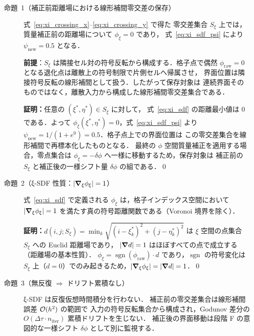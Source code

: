 \begin{description}
\item[命題~1（補正前距離場における線形補間零交差の保存）]
式~\eqref{eq:xi_crossing_x}--\eqref{eq:xi_crossing_y} で得た
零交差集合 $S_\xi$ 上では，質量補正前の距離場について
$\phi_\xi=0$ であり，
式~\eqref{eq:xi_sdf_psi} により $\psi_{\mathrm{new}}=0.5$ となる．

\textbf{前提}：$S_\xi$ は隣接セル対の符号反転から構成する．格子点で偶然
$\phi_{\mathrm{raw}}=0$ となる退化点は離散上の符号制限で片側セルへ帰属させ，
界面位置は隣接符号反転の線形補間として扱う．したがって保存対象は
連続界面そのものではなく，離散入力から構成した線形補間零交差集合である．

\textbf{証明：}任意の $(\xi^*,\eta^*)\in S_\xi$ に対して，
式~\eqref{eq:xi_sdf} の距離最小値は 0 である．よって
$\phi_\xi(\xi^*,\eta^*)=0$，式~\eqref{eq:xi_sdf_psi} より
$\psi_{\mathrm{new}}=1/(1+e^0)=0.5$．格子点上での界面位置は
この零交差集合を線形補間で再標本化したものとなる．
最終の $\phi$ 空間質量補正を適用する場合，零点集合は
$\phi_\xi=-\delta\phi$ へ一様に移動するため，保存対象は
補正前の $S_\xi$ と補正後の一様シフト量 $\delta\phi$ の組である．\qed

\item[命題~2（ξ-SDF 性質：$|\bm{\nabla}_\xi\phi_\xi|=1$）]
式~\eqref{eq:xi_sdf} で定義される $\phi_\xi$ は，格子インデックス空間において
$|\bm{\nabla}_\xi\phi_\xi|=1$ を満たす真の符号距離関数である（Voronoi 境界を除く）．

\textbf{証明：}$d(i,j;S_\xi) = \min_k\sqrt{(i-\xi^*_k)^2+(j-\eta^*_k)^2}$ は
$\xi$ 空間の点集合 $S_\xi$ への Euclid 距離場であり，
$|\bm{\nabla} d|=1$ はほぼすべての点で成立する（距離場の基本性質）．
$\phi_\xi = \operatorname{sgn}(\phi_{\mathrm{raw}}) \cdot d$ であり，$\operatorname{sgn}$ の符号変化は
$S_\xi$ 上（$d=0$）でのみ起きるため，$|\bm{\nabla}_\xi\phi_\xi|=|\bm{\nabla} d|=1$．\qed

\item[命題~3（無反復 $\Rightarrow$ ドリフト累積なし）]
ξ-SDF は反復仮想時間積分を行わない．
補正前の零交差集合は線形補間誤差 $\mathcal{O}(h^2)$ の範囲で
入力の符号反転集合から構成され，Godunov 差分の
$O(\Delta\tau\cdot n_{\mathrm{iter}})$ 累積ドリフトを生じない．
補正後の界面移動は段階 F の意図的な一様シフト
$\delta\phi$ として別に監視する．
\end{description}

